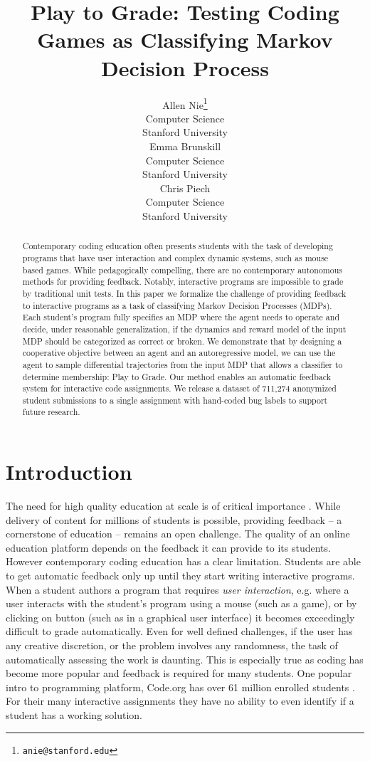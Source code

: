 \documentclass{article}
\title{Play to Grade: Testing Coding Games as Classifying Markov Decision Process}
\author{%
    Allen Nie\thanks{\texttt{anie@stanford.edu}}\\
    Computer Science \\
    Stanford University\\
    \And
    Emma Brunskill\\
    Computer Science \\
    Stanford University\\
    \And
    Chris Piech\\
    Computer Science \\
    Stanford University\\
}
\begin{document}
\maketitle


\begin{abstract}
Contemporary coding education often presents students with the task of developing programs that have user interaction and complex dynamic systems, such as mouse based games. While pedagogically compelling, there are no contemporary autonomous methods for providing feedback. Notably, interactive programs are impossible to grade by traditional unit tests. 
In this paper we formalize the challenge of providing feedback to interactive programs as a task of classifying Markov Decision Processes (MDPs).
Each student's program fully specifies an MDP where the agent needs to operate and decide, under reasonable generalization, if the dynamics and reward model of the input MDP should be categorized as correct or broken.
We demonstrate that by designing a cooperative objective between an agent and an autoregressive model, we can use the agent to sample differential trajectories from the input MDP that allows a classifier to determine membership: Play to Grade. 
Our method enables an automatic feedback system for interactive code assignments. 
We release a dataset of 711,274 anonymized student submissions to a single assignment with hand-coded bug labels to support future research.
\end{abstract}

\section{Introduction}
\vspace{-2mm} 

The need for high quality education at scale is of critical importance \citep{bowen2012cost}. While delivery of content for millions of students is possible, providing feedback -- a cornerstone of education -- remains an open challenge. The quality of an online education platform depends on the feedback it can provide to its students. However contemporary coding education has a clear limitation. Students are able to get automatic feedback only up until they start writing interactive programs. When a student authors a program that requires \emph{user interaction}, e.g. where a user interacts with the student's program using a mouse (such as a game), or by clicking on button (such as in a graphical user interface) it becomes exceedingly difficult to grade automatically. Even for well defined challenges, if the user has any creative discretion, or the problem involves any randomness, the task of automatically assessing the work is daunting. This is especially true as coding has become more popular and feedback is required for many students. One popular intro to programming platform, Code.org has over 61 million enrolled students \cite{code.org}. For their many interactive assignments they have no ability to even identify if a student has a working solution.
\end{document}
